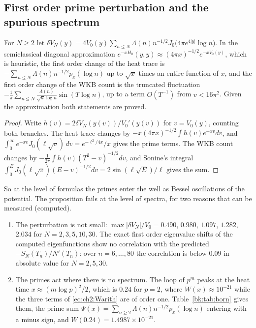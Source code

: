 \subsection{First order prime perturbation and the spurious spectrum}

\begin{proposition}\label{bk:prop:born}
For $N\ge2$ let $\delta V_N(y)=4V_0(y)\sum_{n\le N}\Lambda(n)n^{-1/2}J_0\big(4\pi e^{4|y|}\log n\big)$. In the semiclassical diagonal approximation $e^{-xH_0}(y,y)\approx(4\pi x)^{-1/2}e^{-xV_0(y)}$, which is heuristic, the first order change of the heat trace is $-\sum_{n\le N}\Lambda(n)n^{-1/2}p_x(\log n)$ up to $\sqrt x$ times an entire function of $x$, and the first order change of the WKB count is the truncated fluctuation $-\frac1\pi\sum_{n\le N}\frac{\Lambda(n)}{\sqrt n\log n}\sin(T\log n)$, up to a term $O(T^{-1})$ from $v<16\pi^2$. Given the approximation both statements are proved.
\end{proposition}

\begin{proof}
Write $h(v)=2\delta V_N(y(v))/V_0'(y(v))$ for $v=V_0(y)$, counting both branches. The heat trace changes by $-x(4\pi x)^{-1/2}\int h(v)e^{-xv}dv$, and $\int_0^\infty e^{-xv}J_0(\ell\sqrt v)\,dv=e^{-\ell^2/4x}/x$ gives the prime terms. The WKB count changes by $-\frac1{2\pi}\int h(v)(T^2-v)^{-1/2}dv$, and Sonine's integral $\int_0^EJ_0(\ell\sqrt v)(E-v)^{-1/2}dv=2\sin(\ell\sqrt E)/\ell$ gives the sum.
\end{proof}

So at the level of formulas the primes enter the well as Bessel oscillations of the potential. The proposition fails at the level of spectra, for two reasons that can be measured (computed).

\begin{enumerate}
\item The perturbation is not small: $\max|\delta V_N|/V_0=0.490$, $0.980$, $1.097$, $1.282$, $2.034$ for $N=2,3,5,10,30$. The exact first order eigenvalue shifts of the computed eigenfunctions show no correlation with the predicted $-S_N(T_n)/\bar N'(T_n)$: over $n=6,\dots,80$ the correlation is below $0.09$ in absolute value for $N=2,5,30$.
\item The primes act where there is no spectrum. The loop of $p^m$ peaks at the heat time $x\approx(m\log p)^2/2$, which is $0.24$ for $p=2$, where $W(x)\approx10^{-21}$ while the three terms of \eqref{eq:ch2:Warith} are of order one. Table~\ref{bk:tab:born} gives them, the prime sum $\Psi(x)=\sum_{n\ge2}\Lambda(n)n^{-1/2}p_x(\log n)$ entering with a minus sign, and $W(0.24)=1.4987\times10^{-21}$.
\end{enumerate}


